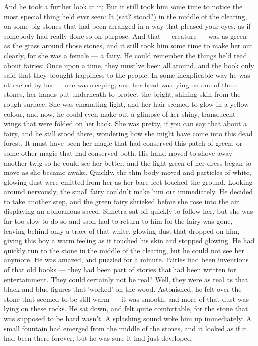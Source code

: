 And he took a further look at it; But it still took him some time to notice the most special thing he'd ever seen: It (sat? stood?) in the middle of the clearing, on some big stones that had been arranged in a way that pleased your eyes, as if somebody had really done so on purpose. 
And that --- creature --- was as green as the grass around those stones, and it still took him some time to make her out clearly, for she was a female --- a fairy. He could remember the things he'd read about fairies: Once upon a time, they must've been all around, and the book only said that they brought happiness to the people. 
In some inexplicable way he was attracted by her --- she was sleeping, and her head was lying on one of these stones, her hands put underneath to protect the bright, shining skin from the rough surface. She was emanating light, and her hair seemed to glow in a yellow colour, and now, he could even make out a glimpse of her shiny, translucent wings that were folded on her back. 
She was pretty, if you can say that about a fairy, and he still stood there, wondering how she might have come into this dead forest. It must have been her magic that had conserved this patch of green, or some other magic that had conserved both. 
His hand moved to shove away another twig so he could see her better, and the light green of her dress began to move as she became awake. 
Quickly, the thin body moved and particles of white, glowing dust were emitted from her as her bare feet touched the ground. Looking around nervously, the small fairy couldn't make him out immediately. He decided to take another step, and the green fairy shrieked before she rose into the air displaying an abnormous speed. Simetra sat off quickly to follow her, but she was far too slow to do so and soon had to return to him for the fairy was gone, leaving behind only a trace of that white, glowing dust that dropped on him, giving this boy a warm feeling as it touched his skin and stopped glowing. He had quickly run to the stone in the middle of the clearing, but he could not see her anymore. 
He was amazed, and puzzled for a minute. Fairies had been inventions of that old books --- they had been part of stories that had been written for entertainment. They could certainly not be real? Well, they were as real as that black and blue figures that 'worked' on the wood. 
Astonished, he felt over the stone that seemed to be still warm --- it was smooth, and more of that dust was lying on these rocks. He sat down, and felt quite comfortable, for the stone that was supposed to be hard wasn't. 
A splashing sound woke him up immediately: A small fountain had emerged from the middle of the stones, and it looked as if it had been there forever, but he was sure it had just developed. 
